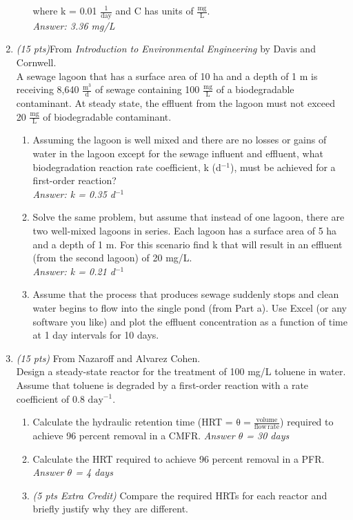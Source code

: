 \documentclass[12pt,letterpaper]{article}
\begin{document}
\begin{enumerate}
\begin{enumerate}
where k = 0.01 $\mathrm{\frac{1}{day}}$ and C has units of $\mathrm{\frac{mg}{L}}$.\\
\emph{Answer: 3.36 mg/L}
\end{enumerate}

\item \emph{(15 pts)}From \emph{Introduction to Environmental Engineering} by Davis and Cornwell.\\
A sewage lagoon that has a surface area of 10 ha and a depth of 1 m is receiving 8,640 $\mathrm{\frac{m^3}{d}}$ of sewage containing 100 $\mathrm{\frac{mg}{L}}$ of a biodegradable contaminant.  At steady state, the effluent from the lagoon must not exceed 20 $\mathrm{\frac{mg}{L}}$ of biodegradable contaminant.
\begin{enumerate}
\item Assuming the lagoon is well mixed and there are no losses or gains of water in the lagoon except for the sewage influent and effluent, what biodegradation reaction rate coefficient, k (d$^{-1}$), must be achieved for a first-order reaction?\\
\emph{Answer: k = 0.35 d$^{-1}$}

\item Solve the same problem, but assume that instead of one lagoon, there are two well-mixed lagoons in series.  Each lagoon has a surface area of 5 ha and a depth of 1 m.  For this scenario find k that will result in an effluent (from the second lagoon) of 20 mg/L.\\
\emph{Answer: k = 0.21 d$^{-1}$}

\item Assume that the process that produces sewage suddenly stops and clean water begins to flow into the single pond (from Part a).  Use Excel (or any software you like) and plot the effluent concentration as a function of time at 1 day intervals for 10 days. 
 
\end{enumerate}
\item \emph{(15 pts)} From Nazaroff and Alvarez Cohen.\\
Design a steady-state reactor for the treatment of 100 mg/L toluene in water.  Assume that toluene is degraded by a first-order reaction with a rate coefficient of 0.8 $\mathrm{day^{-1}}$.
\begin{enumerate}
\item Calculate the hydraulic retention time (HRT = $\mathrm{\theta = \frac{volume}{flow\, rate}}$) required to achieve 96 percent removal in a CMFR. \emph{Answer $\theta$ = 30 days}
\item Calculate the HRT required to achieve 96 percent removal in a PFR.\\
\emph{Answer $\theta$ = 4 days}
\item \emph{(5 pts Extra Credit)} Compare the required HRTs for each reactor and briefly justify why they are different.
\end{enumerate}
\end{enumerate}
\end{document}
